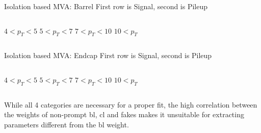 \begin{frame}{Isolation based MVA: Barrel}
	First row is Signal, second is Pileup
	\vspace{1cm}
	\begin{columns}[c]
			\centering
			$4<p_T<5$
			\centering
			$5<p_T<7$
			\centering
			$7<p_T<10$
			\centering
			$10<p_T$
	\end{columns}
\end{frame}

\begin{frame}{Isolation based MVA: Endcap}
	First row is Signal, second is Pileup
	\vspace{1cm}
	\begin{columns}[c]
			\centering
			$4<p_T<5$
			\centering
			$5<p_T<7$
			\centering
			$7<p_T<10$
			\centering
			$10<p_T$
	\end{columns}
\end{frame}

\begin{frame}
	
	\begin{block}{}
		While all 4 categories are necessary for a proper fit, the high correlation between the weights of non-prompt bl, cl and fakes makes it unsuitable for extracting parameters different from the bl weight.
	\end{block}
\end{frame}
